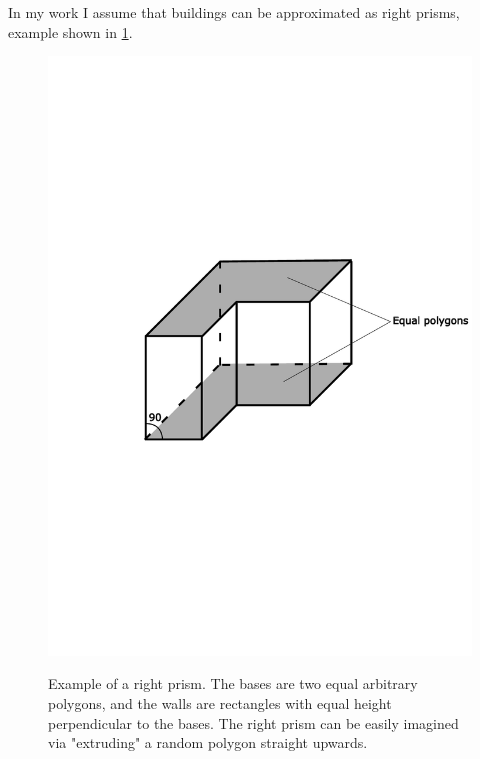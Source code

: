 \documentclass[]{nsm-thesis}
\begin{document}
In my work I assume that buildings can be approximated as right prisms, example shown in \cref{fig:rightprism}. 

\begin{figure}
  	\caption{Example of a right prism. The bases are two equal arbitrary polygons, and the walls are rectangles with equal height perpendicular to the bases. The right prism can be easily imagined via "extruding" a random polygon straight upwards.}
	\centering
	\includegraphics[width=1\textwidth]{figures/RightPrism.pdf}
	\label{fig:rightprism}
\end{figure}
\end{document}
